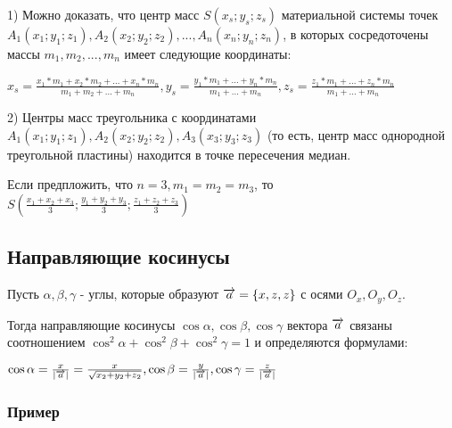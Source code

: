 \documentclass{article}
\def\vec{\ensuremath\overrightarrow}
\begin{document}
\begin{flushleft}

1) Можно доказать, что центр масс $S(x_s; y_s; z_s)$ материальной системы точек $A_1(x_1; y_1; z_1), A_2(x_2; y_2; z_2), ..., A_n(x_n; y_n; z_n)$, в которых сосредоточены массы $m_1, m_2, ..., m_n$ имеет следующие координаты:

$x_s = \frac{x_1 * m_1 + x_2 * m_2 + ... + x_n * m_n}{m_1 + m_2 + ... + m_n}, y_s = \frac{y_1 * m_1 + ... + y_n * m_n}{m_1 + ... + m_n}, z_s = \frac{z_1 * m_1 + ... + z_n * m_n}{m_1 + ... + m_n}$

\hfill

2) Центры масс треугольника с координатами $A_1(x_1; y_1; z_1), A_2(x_2; y_2; z_2), A_3(x_3; y_3; z_3)$ (то есть, центр масс однородной треугольной пластины) находится в точке пересечения медиан.

Если предпложить, что $n = 3, m_1 = m_2 = m_3$, то $S(\frac{x_1 + x_2 + x_3}{3}; \frac{y_1 + y_2 + y_3}{3}; \frac{z_1 + z_2 + z_3}{3})$

\end{flushleft}

\subsection{Направляющие косинусы}

\begin{flushleft}

Пусть $\alpha, \beta, \gamma$ - углы, которые образуют $\vec{a} = \{x, z, z\}$ с осями $O_x, O_y, O_z$.

Тогда направляющие косинусы $\cos \alpha, \cos \beta, \cos \gamma$ вектора $\vec{a}$ связаны соотношением $\cos^2 \alpha + \cos^2 \beta + \cos^2 \gamma = 1$ и определяются формулами:

$\cos \alpha = \frac{x}{|\vec{a}|} = \frac{x}{\sqrt{x_2 + y_2 + z_2}}, \cos \beta = \frac{y}{|\vec{a}|}, \cos \gamma = \frac{z}{|\vec{a}|}$

\end{flushleft}

\subsubsection{Пример}
\end{document}
